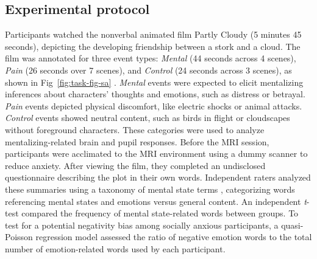 \subsection{Experimental protocol} 
Participants watched the nonverbal animated film Partly Cloudy (5 minutes 45 seconds), depicting the developing friendship between a stork and a cloud. The film was annotated for three event types: \textit{Mental} (44 seconds across 4 scenes), \textit{Pain} (26 seconds over 7 scenes), and \textit{Control} (24 seconds across 3 scenes), as shown in Fig~\ref{fig:task-fig-sa} \citep{jacoby2016}. \textit{Mental} events were expected to elicit mentalizing inferences about characters' thoughts and emotions, such as distress or betrayal. \textit{Pain} events depicted physical discomfort, like electric shocks or animal attacks. \textit{Control} events showed neutral content, such as birds in flight or cloudscapes without foreground characters. These categories were used to analyze mentalizing-related brain and pupil responses. Before the MRI session, participants were acclimated to the MRI environment using a dummy scanner to reduce anxiety. After viewing the film, they completed an undisclosed questionnaire describing the plot in their own words. Independent raters analyzed these summaries using a taxonomy of mental state terms \citep{bang2013}, categorizing words referencing mental states and emotions versus general content. An independent \textit{t}-test compared the frequency of mental state-related words between groups. To test for a potential negativity bias among socially anxious participants, a quasi-Poisson regression model assessed the ratio of negative emotion words to the total number of emotion-related words used by each participant.



